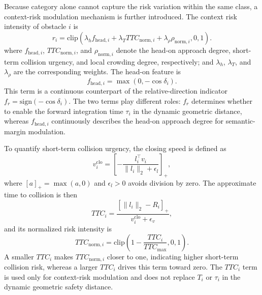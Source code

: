 \documentclass[journal]{IEEEtranTIE}
\begin{document}
    Because category alone cannot capture the risk variation within the same
    class, a context-risk modulation mechanism is further introduced. The context
    risk intensity of obstacle $i$ is
    \begin{equation}
    r_i=\mathrm{clip}\left(
    \lambda_h f_{\mathrm{head},i}
    +\lambda_T TTC_{\mathrm{norm},i}
    +\lambda_\rho \rho_{\mathrm{norm},i},0,1
    \right).
    \end{equation}
    where $f_{\mathrm{head},i}$, $TTC_{\mathrm{norm},i}$, and
    $\rho_{\mathrm{norm},i}$ denote the head-on approach degree, short-term
    collision urgency, and local crowding degree, respectively; and $\lambda_h$,
    $\lambda_T$, and $\lambda_\rho$ are the corresponding weights.
    The head-on feature is
    \begin{equation}
    f_{\mathrm{head},i}=\max(0,-\cos\delta_i).
    \end{equation}
    This term is a continuous counterpart of the relative-direction indicator
    $f_r=\mathrm{sign}(-\cos\delta_i)$. The two terms play different roles:
    $f_r$ determines whether to enable the forward integration time $\tau_i$ in
    the dynamic geometric distance, whereas $f_{\mathrm{head},i}$ continuously
    describes the head-on approach degree for semantic-margin modulation.

    To quantify short-term collision urgency, the closing speed is defined as
    \begin{equation}
    v_i^{\mathrm{clo}}=
    \left[
    -\frac{l_i^\top v_i}{\|l_i\|_2+\epsilon_l}
    \right]_+,
    \end{equation}
    where $[a]_+=\max(a,0)$ and $\epsilon_l>0$ avoids division by zero. The
    approximate time to collision is then
    \begin{equation}
    TTC_i=\frac{[\|l_i\|_2-R_i]_+}{v_i^{\mathrm{clo}}+\epsilon_v},
    \end{equation}
    and its normalized risk intensity is
    \begin{equation}
    TTC_{\mathrm{norm},i}=
    \mathrm{clip}\left(1-\frac{TTC_i}{TTC_{\max}},0,1\right).
    \end{equation}
    A smaller $TTC_i$ makes $TTC_{\mathrm{norm},i}$ closer to one, indicating
    higher short-term collision risk, whereas a larger $TTC_i$ drives this term
    toward zero. The $TTC_i$ term is used only for context-risk modulation and
    does not replace $T_i$ or $\tau_i$ in the dynamic geometric safety distance.
\end{document}
